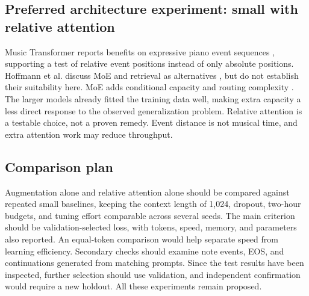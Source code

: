 \subsection*{Preferred architecture experiment: small with relative attention}
Music Transformer reports benefits on expressive piano event sequences \citep{huang2019musictransformer}, supporting a test of relative event positions instead of only absolute positions. Hoffmann et al. discuss MoE and retrieval as alternatives \citep[Section~2]{hoffmann2022compute}, but do not establish their suitability here. MoE adds conditional capacity and routing complexity \citep{fedus2022switch}. The larger models already fitted the training data well, making extra capacity a less direct response to the observed generalization problem. Relative attention is a testable choice, not a proven remedy. Event distance is not musical time, and extra attention work may reduce throughput.

\subsection*{Comparison plan}
Augmentation alone and relative attention alone should be compared against repeated small baselines, keeping the context length of 1,024, dropout, two-hour budgets, and tuning effort comparable across several seeds. The main criterion should be validation-selected loss, with tokens, speed, memory, and parameters also reported. An equal-token comparison would help separate speed from learning efficiency. Secondary checks should examine note events, EOS, and continuations generated from matching prompts. Since the test results have been inspected, further selection should use validation, and independent confirmation would require a new holdout. All these experiments remain proposed.

